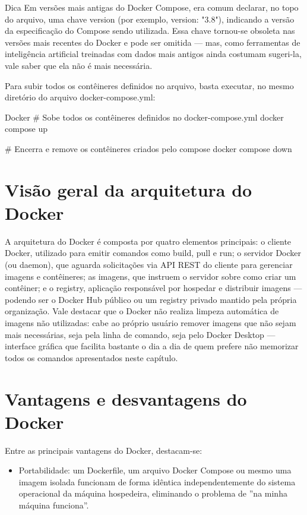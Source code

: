 \begin{infobox}{Dica}
Em versões mais antigas do Docker Compose, era comum declarar, no topo do arquivo, uma chave version (por exemplo, version: "3.8"), indicando a versão da especificação do Compose sendo utilizada. Essa chave tornou-se obsoleta nas versões mais recentes do Docker e pode ser omitida — mas, como ferramentas de inteligência artificial treinadas com dados mais antigos ainda costumam sugeri-la, vale saber que ela não é mais necessária.
\end{infobox}

Para subir todos os contêineres definidos no arquivo, basta executar, no mesmo diretório do arquivo docker-compose.yml:

\begin{infobox}{Docker}
\# Sobe todos os contêineres definidos no docker-compose.yml docker compose up
\end{infobox}

\# Encerra e remove os contêineres criados pelo compose docker compose down

\section{Visão geral da arquitetura do Docker}

A arquitetura do Docker é composta por quatro elementos principais: o cliente Docker, utilizado para emitir comandos como build, pull e run; o servidor Docker (ou daemon), que aguarda solicitações via API REST do cliente para gerenciar imagens e contêineres; as imagens, que instruem o servidor sobre como criar um contêiner; e o registry, aplicação responsável por hospedar e distribuir imagens — podendo ser o Docker Hub público ou um registry privado mantido pela própria organização. Vale destacar que o Docker não realiza limpeza automática de imagens não utilizadas: cabe ao próprio usuário remover imagens que não sejam mais necessárias, seja pela linha de comando, seja pelo Docker Desktop — interface gráfica que facilita bastante o dia a dia de quem prefere não memorizar todos os comandos apresentados neste capítulo.

\section{Vantagens e desvantagens do Docker}

Entre as principais vantagens do Docker, destacam-se:

\begin{itemize}
  \item Portabilidade: um Dockerfile, um arquivo Docker Compose ou mesmo uma imagem isolada funcionam de forma idêntica independentemente do sistema operacional da máquina hospedeira, eliminando o problema de ”na minha máquina funciona”.
\end{itemize}

